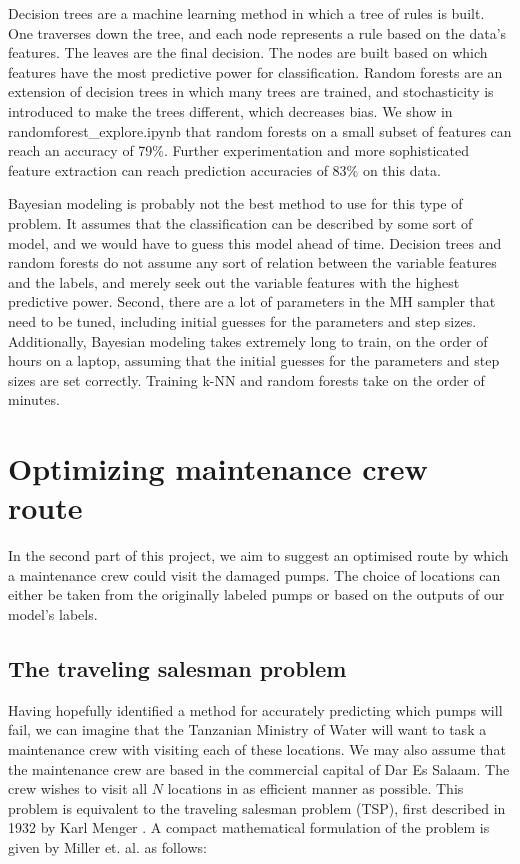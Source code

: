 \documentclass{article} %
\begin{document}
\begin{multicols}{2}
Decision trees are a machine learning method in which a tree of rules is built. One traverses down the tree, and each node represents a rule based on the data's features. The leaves are the final decision. The nodes are built based on which features have the most predictive power for classification. Random forests are an extension of decision trees in which many trees are trained, and stochasticity is introduced to make the trees different, which decreases bias. We show in randomforest\_explore.ipynb that random forests on a small subset of features can reach an accuracy of 79\%. Further experimentation and more sophisticated feature extraction can reach prediction accuracies of 83\% on this data.

Bayesian modeling is probably not the best method to use for this type of problem. It assumes that the classification can be described by some sort of model, and we would have to guess this model ahead of time. Decision trees and random forests do not assume any sort of relation between the variable features and the labels, and merely seek out the variable features with the highest predictive power. Second, there are a lot of parameters in the MH sampler that need to be tuned, including initial guesses for the parameters and step sizes. Additionally, Bayesian modeling takes extremely long to train, on the order of hours on a laptop, assuming that the initial guesses for the parameters and step sizes are set correctly. Training k-NN and random forests take on the order of minutes.

\section{Optimizing maintenance crew route}

In the second part of this project, we aim to suggest an optimised route by which a maintenance crew could visit the damaged pumps. The choice of locations can either be taken from the originally labeled pumps or based on the outputs of our model's labels. 

\subsection{The traveling salesman problem}

Having hopefully identified a method for accurately predicting which pumps will fail, we can imagine that the Tanzanian Ministry of Water will want to task a maintenance crew with visiting each of these locations. We may also assume that the maintenance crew are based in the commercial capital of Dar Es Salaam. The crew wishes to visit all $N$ locations in as efficient manner as possible. This problem is equivalent to the traveling salesman problem (TSP), first described in 1932 by Karl Menger \cite{Menger}. A compact mathematical formulation of the problem is given by Miller et. al. \cite{Miller1960} as follows:



\end{multicols}
\end{document}
